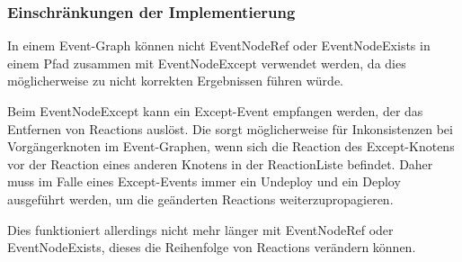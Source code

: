 \subsubsection{Einschränkungen der Implementierung}
In einem Event-Graph können nicht EventNodeRef oder EventNodeExists in einem
Pfad zusammen mit EventNodeExcept verwendet werden, da dies möglicherweise zu
nicht korrekten Ergebnissen führen würde.

Beim EventNodeExcept kann ein Except-Event empfangen werden, der das Entfernen
von Reactions auslöst. Die sorgt möglicherweise für Inkonsistenzen
bei Vorgängerknoten im Event-Graphen, wenn sich die Reaction des Except-Knotens
vor der Reaction eines anderen Knotens in der ReactionListe befindet.
Daher muss im Falle eines Except-Events immer ein Undeploy und ein Deploy
ausgeführt  werden, um die geänderten Reactions weiterzupropagieren.

Dies funktioniert allerdings nicht mehr länger mit EventNodeRef oder
EventNodeExists, dieses die Reihenfolge von Reactions verändern können.
